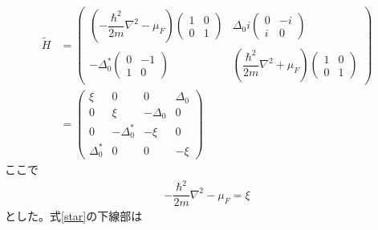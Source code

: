 \documentclass{jarticle}
\begin{document}
    \begin{align}
  \tilde{H}&=
       \begin{pmatrix}
  (-\dfrac{\hbar^2}{2m}\nabla^2-\mu_F)\begin{pmatrix}
  1 & 0 \\
  0 & 1
  \end{pmatrix} & \Delta_0i \begin{pmatrix}
  0 & -i \\
  i & 0
  \end{pmatrix} \\
  -\Delta^{*}_0\begin{pmatrix}
  0 & -1 \\
  1& 0
  \end{pmatrix} & (\dfrac{\hbar^2}{2m}\nabla^2+\mu_F)\begin{pmatrix}
  1 & 0 \\
  0 & 1
  \end{pmatrix}
  \end{pmatrix}
  \\&=\begin{pmatrix}
  \xi & 0 & 0 & \Delta_0 \\ 
  0 & \xi & -\Delta_0 & 0 \\ 
  0 & -\Delta^{*}_0 & -\xi & 0 \\ 
  \Delta^{*}_0 & 0 & 0 & -\xi
  \end{pmatrix} 
  \end{align}
  ここで
  \begin{align}
  -\dfrac{\hbar^2}{2m}\nabla^2-\mu_F=\xi
  \end{align}
  とした。式\ref{star}の下線部は\\
\end{document}
